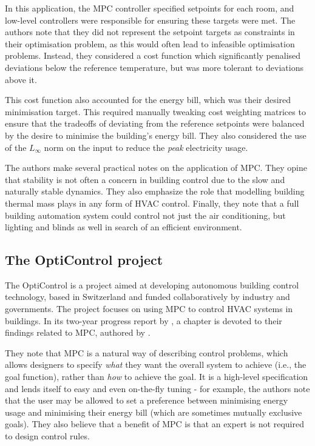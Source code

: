 In this application, the MPC controller specified setpoints for each room, and low-level controllers were responsible for ensuring these targets were met.
The authors note that they did not represent the setpoint targets as constraints in their optimisation problem, as this would often lead to infeasible optimisation problems.
Instead, they considered a cost function which significantly penalised deviations below the reference temperature, but was more tolerant to deviations above it.

This cost function also accounted for the energy bill, which was their desired minimisation target.
This required manually tweaking cost weighting matrices to ensure that the tradeoffs of deviating from the reference setpoints were balanced by the desire to minimise the building's energy bill.
They also considered the use of the $L_\infty$ norm on the input to reduce the {\it peak} electricity usage.

The authors make several practical notes on the application of MPC.
They opine that stability is not often a concern in building control due to the slow and naturally stable dynamics.
They also emphasize the role that modelling building thermal mass plays in any form of HVAC control.
Finally, they note that a full building automation system could control not just the air conditioning, but lighting and blinds as well in search of an efficient environment.

\subsection{The OptiControl project}

The OptiControl is a project aimed at developing autonomous building control technology, based in Switzerland and funded collaboratively by industry and governments.
The project focuses on using MPC to control HVAC systems in buildings.
In its two-year progress report by \textcite{Gyalistras10}, a chapter is devoted to their findings related to MPC, authored by \textcite{Oldewurtel10}.

They note that MPC is a natural way of describing control problems, which allows designers to specify {\it what} they want the overall system to achieve (i.e., the goal function), rather than {\it how} to achieve the goal.
It is a high-level specification\footnotemark{} and lends itself to easy and even on-the-fly tuning - for example, the authors note that the user may be allowed to set a preference between minimising energy usage and minimising their energy bill (which are sometimes mutually exclusive goals).
They also believe that a benefit of MPC is that an expert is not required to design control rules.

